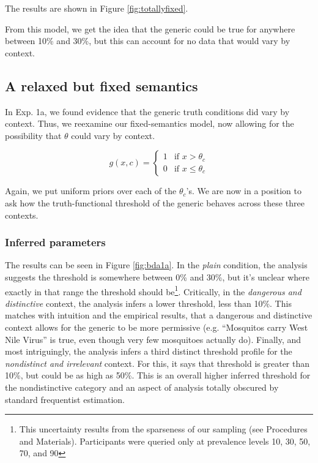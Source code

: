 \documentclass[10pt,letterpaper]{article}
\begin{document}
The results are shown in Figure \ref{fig:totallyfixed}. 


From this model, we get the idea that the generic could be true for anywhere between 10\% and 30\%, but this can account for no data that would vary by context.

\subsection{A relaxed but fixed semantics}

 In Exp. 1a, we found evidence that the generic truth conditions did vary by context. Thus, we reexamine our fixed-semantics model, now allowing for the possibility that $\theta$ could vary by context.


\[
 g(x, c) =
  \begin{cases}
   1 & \text{if } x > \theta_{c} \\
   0       & \text{if } x \leq \theta_{c}
  \end{cases}
\]

Again, we put uniform priors over each of the $\theta_{c}$'s. We are now in a position to ask how the truth-functional threshold of the generic behaves across these three contexts. 

\subsubsection{Inferred parameters}

The results can be seen in Figure \ref{fig:bda1a}. In the \emph{plain} condition, the analysis suggests the threshold is somewhere between 0\% and 30\%, but it's unclear where exactly in that range the threshold should be\footnote{This uncertainty results from the sparseness of our sampling (see Procedures and Materials). Participants were queried only at prevalence levels 10, 30, 50, 70, and 90}. Critically, in the \emph{dangerous and distinctive} context, the analysis infers a lower threshold, less than 10\%. This matches with intuition and the empirical results, that a dangerous and distinctive context allows for the generic to be more permissive (e.g. ``Mosquitos carry West Nile Virus'' is true, even though very few mosquitoes actually do). Finally, and most intriguingly, the analysis infers a third distinct threshold profile for the \emph{nondistinct and irrelevant} context.  For this, it says that threshold is greater than 10\%, but could be as high as 50\%. This is an overall higher inferred threshold for the nondistinctive category and an aspect of analysis totally obscured by standard frequentist estimation. 
\end{document}
